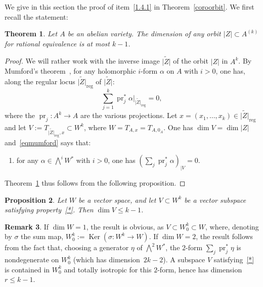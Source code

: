 \documentclass[11pt]{article}
\newtheorem{theo}{Theorem}[section]
\newtheorem{prop}[theo]{Proposition}
\theoremstyle{definition}
\newtheorem{rema}[theo]{Remark}
\numberwithin{equation}{section}
\numberwithin{figure}{section}
\numberwithin{table}{section}
\DeclareMathOperator{\Ker}{Ker}
\DeclareMathOperator{\pr}{pr}
\newcommand{\reg}{\mathrm{reg}}
\begin{document}
We give in this section the proof of item~\eqref{1.4.1} in Theorem~\ref{coroorbit}. We first recall the statement:

\begin{theo}\label{ledimorbit}
Let $A$ be an abelian variety. The dimension of any orbit
$|Z|\subset A^{(k)}$ for rational equivalence is at most $k-1$.
\end{theo}

\begin{proof}
We will rather work with the inverse image $\widetilde{|Z|}$ of the orbit $|Z|$ in $A^k$. By Mumford's theorem~\cite{mumford}, for any holomorphic $i$-form $\alpha$ on $A$ with $i>0$, one has, along the regular locus $\widetilde{|Z|}_{{\reg}}$ of $\widetilde{|Z|}$:
\begin{equation}\label{eqmumford}
\sum_{j=1}^k\pr_j^*\alpha|_{ \widetilde{|Z|}_{\reg}}=0,
\end{equation}
where the $\pr_j:A^k\rightarrow A$ are the various projections. Let $x=(x_1,\dots,x_k)\in \widetilde{|Z|}_{\reg}$ and let $V:=T_{\widetilde{|Z|}_{\reg},x}\subset W^k$, where $W=T_{A,x}=T_{A,0_A}$. One has $\dim V=\dim |Z|$ and~\eqref{eqmumford} says that:
\begin{enumerate}
\renewcommand{\theenumi}{$\ast$}
\item \label{*} for any $\alpha\in \bigwedge^iW^*$ with $i>0$, one has $(\sum_j\pr_j^*\alpha)_{\mid V}=0$.
\end{enumerate}
Theorem~\ref{ledimorbit} thus follows from the following proposition.
\end{proof}

\begin{prop}\label{ledimorbitinfinitesimal}
Let $W$ be a vector space, and let $V\subset W^k$ be a vector subspace
satisfying property~\eqref{*}. Then $\dim V\leq k-1$.
\end{prop}

\begin{rema}
If $\dim W=1$, the result is obvious, as $V\subset W^k_0\subset W$, where,
denoting by $\sigma$ the sum map, $W^k_0:=\Ker (\sigma: W^k\rightarrow W)$. If $\dim W=2$, the result follows from the fact that, choosing a generator $\eta$ of $\bigwedge^2W^*$, the $2$-form $\sum_j\pr_j^*\eta$ is nondegenerate on $W^k_0$ (which has dimension~$2k-2$). A subspace $V$ satisfying~\eqref{*} is contained in $W^k_0$ and totally isotropic for this $2$-form, hence has dimension $r\leq k-1$.
\end{rema}
\end{document}
